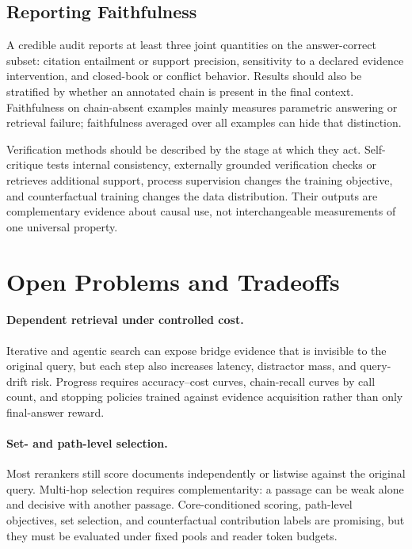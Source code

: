 \documentclass[manuscript,review]{acmart}
\theoremstyle{definition}
\theoremstyle{plain}
\theoremstyle{remark}
\begin{document}
\subsection{Reporting Faithfulness}

A credible audit reports at least three joint quantities on the answer-correct
subset: citation entailment or support precision, sensitivity to a declared
evidence intervention, and closed-book or conflict behavior. Results should
also be stratified by whether an annotated chain is present in the final
context. Faithfulness on chain-absent examples mainly measures parametric
answering or retrieval failure; faithfulness averaged over all examples can
hide that distinction.

Verification methods should be described by the stage at which they act.
Self-critique tests internal consistency, externally grounded verification
checks or retrieves additional support, process supervision changes the
training objective, and counterfactual training changes the data distribution.
Their outputs are complementary evidence about causal use, not interchangeable
measurements of one universal property.

\section{Open Problems and Tradeoffs}
\label{sec:tradeoffs}

\paragraph{Dependent retrieval under controlled cost.}
Iterative and agentic search can expose bridge evidence that is invisible to
the original query, but each step also increases latency, distractor mass, and
query-drift risk. Progress requires accuracy--cost curves, chain-recall curves
by call count, and stopping policies trained against evidence acquisition
rather than only final-answer reward.

\paragraph{Set- and path-level selection.}
Most rerankers still score documents independently or listwise against the
original query. Multi-hop selection requires complementarity: a passage can
be weak alone and decisive with another passage. Core-conditioned scoring,
path-level objectives, set selection, and counterfactual contribution labels
are promising, but they must be evaluated under fixed pools and reader token
budgets.
\end{document}
